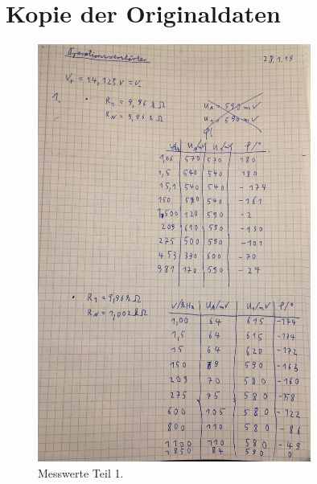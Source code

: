 \section{Kopie der Originaldaten}
\begin{figure}
  \centering
  \includegraphics[width=0.8\textwidth]{Messwerte/1.jpg}
  \caption{Messwerte Teil 1.}
  \label{fig:messwerte1}
\end{figure}
